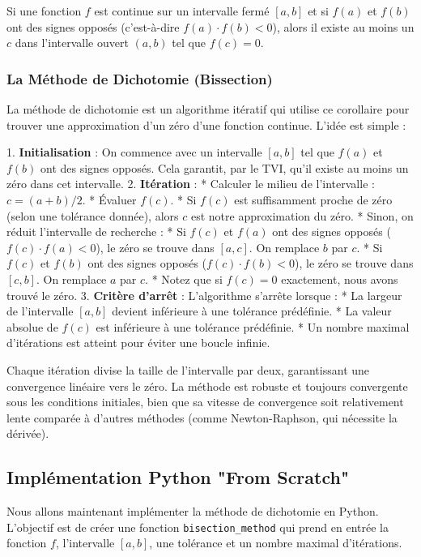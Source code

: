 \documentclass[12pt,a4paper]{report}
\begin{document}
Si une fonction $f$ est continue sur un intervalle fermé $[a, b]$ et si $f(a)$ et $f(b)$ ont des signes opposés (c'est-à-dire $f(a) \cdot f(b) < 0$), alors il existe au moins un $c$ dans l'intervalle ouvert $(a, b)$ tel que $f(c) = 0$.

\subsubsection{La Méthode de Dichotomie (Bissection)}

La méthode de dichotomie est un algorithme itératif qui utilise ce corollaire pour trouver une approximation d'un zéro d'une fonction continue. L'idée est simple :

1.  \textbf{Initialisation} : On commence avec un intervalle $[a, b]$ tel que $f(a)$ et $f(b)$ ont des signes opposés. Cela garantit, par le TVI, qu'il existe au moins un zéro dans cet intervalle.
2.  \textbf{Itération} :
    *   Calculer le milieu de l'intervalle : $c = (a + b) / 2$.
    *   Évaluer $f(c)$.
    *   Si $f(c)$ est suffisamment proche de zéro (selon une tolérance donnée), alors $c$ est notre approximation du zéro.
    *   Sinon, on réduit l'intervalle de recherche :
        *   Si $f(c)$ et $f(a)$ ont des signes opposés ($f(c) \cdot f(a) < 0$), le zéro se trouve dans $[a, c]$. On remplace $b$ par $c$.
        *   Si $f(c)$ et $f(b)$ ont des signes opposés ($f(c) \cdot f(b) < 0$), le zéro se trouve dans $[c, b]$. On remplace $a$ par $c$.
        *   Notez que si $f(c) = 0$ exactement, nous avons trouvé le zéro.
3.  \textbf{Critère d'arrêt} : L'algorithme s'arrête lorsque :
    *   La largeur de l'intervalle $[a, b]$ devient inférieure à une tolérance prédéfinie.
    *   La valeur absolue de $f(c)$ est inférieure à une tolérance prédéfinie.
    *   Un nombre maximal d'itérations est atteint pour éviter une boucle infinie.

Chaque itération divise la taille de l'intervalle par deux, garantissant une convergence linéaire vers le zéro. La méthode est robuste et toujours convergente sous les conditions initiales, bien que sa vitesse de convergence soit relativement lente comparée à d'autres méthodes (comme Newton-Raphson, qui nécessite la dérivée).

\subsection{Implémentation Python "From Scratch"}

Nous allons maintenant implémenter la méthode de dichotomie en Python. L'objectif est de créer une fonction \texttt{bisection\_method} qui prend en entrée la fonction $f$, l'intervalle $[a, b]$, une tolérance et un nombre maximal d'itérations.
\end{document}
